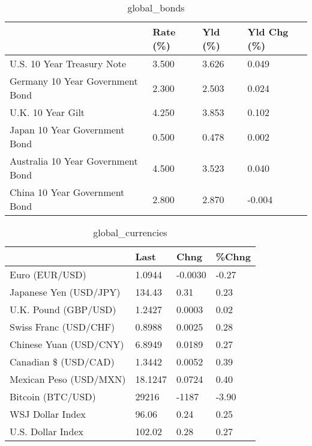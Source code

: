 \documentclass{article}%
\begin{document}
%


\begin{table}[htbp]%
\caption{global\_bonds}%
\centering%
\begin{adjustbox}{width=1\textwidth}%
\begin{tabular}{llll}
\toprule
                                  & Rate (\%) & Yld (\%) & Yld Chg (\%) \\
\midrule
       U.S. 10 Year Treasury Note &    3.500 &   3.626 &       0.049 \\
  Germany 10 Year Government Bond &    2.300 &   2.503 &       0.024 \\
                U.K. 10 Year Gilt &    4.250 &   3.853 &       0.102 \\
    Japan 10 Year Government Bond &    0.500 &   0.478 &       0.002 \\
Australia 10 Year Government Bond &    4.500 &   3.523 &       0.040 \\
    China 10 Year Government Bond &    2.800 &   2.870 &      -0.004 \\
\bottomrule
\end{tabular}
%
\end{adjustbox}%
\end{table}

%


\begin{table}[htbp]%
\caption{global\_currencies}%
\centering%
\begin{adjustbox}{width=1\textwidth}%
\begin{tabular}{llll}
\toprule
                       &    Last &    Chng & \%Chng \\
\midrule
        Euro (EUR/USD) &  1.0944 & -0.0030 & -0.27 \\
Japanese Yen (USD/JPY) &  134.43 &    0.31 &  0.23 \\
  U.K. Pound (GBP/USD) &  1.2427 &  0.0003 &  0.02 \\
 Swiss Franc (USD/CHF) &  0.8988 &  0.0025 &  0.28 \\
Chinese Yuan (USD/CNY) &  6.8949 &  0.0189 &  0.27 \\
  Canadian \$ (USD/CAD) &  1.3442 &  0.0052 &  0.39 \\
Mexican Peso (USD/MXN) & 18.1247 &  0.0724 &  0.40 \\
     Bitcoin (BTC/USD) &   29216 &   -1187 & -3.90 \\
      WSJ Dollar Index &   96.06 &    0.24 &  0.25 \\
     U.S. Dollar Index &  102.02 &    0.28 &  0.27 \\
\bottomrule
\end{tabular}
%
\end{adjustbox}%
\end{table}
\end{document}
